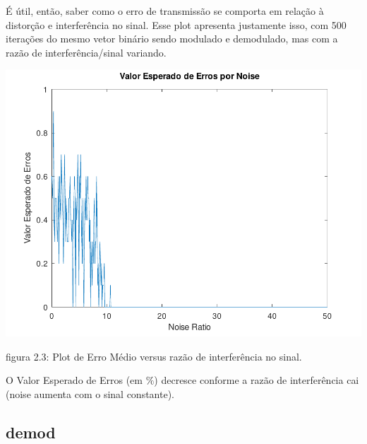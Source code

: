 \documentclass[11pt,a4paper]{report}
\begin{document}
	É útil, então, saber como o erro de transmissão se comporta em relação à distorção e interferência no sinal. Esse plot apresenta justamente isso, com 500 iterações do mesmo vetor binário sendo modulado e demodulado, mas com a razão de interferência/sinal variando. 
	\begin{center}

		\includegraphics[clip, trim=0.0cm 0cm 0.0cm 0.0cm, 								width=1.00\textwidth]{errorplot}
	\end{center}
\begin{center}
	{\footnotesize figura 2.3: Plot de Erro Médio versus razão de interferência no sinal.}
\end{center}
	O Valor Esperado de Erros (em $\%$) decresce conforme a razão de interferência cai (noise aumenta com o sinal constante).
	\subsection{demod}
	
\end{document}
